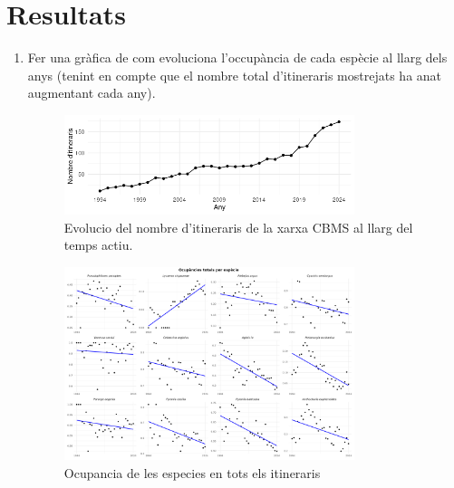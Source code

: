 \documentclass{article}
\begin{document}
\section{Resultats}
\begin{enumerate}
    \item Fer una gr\`afica de com evoluciona l'occup\`ancia de cada esp\`ecie al llarg dels anys (tenint en compte que el nombre total d'itineraris mostrejats ha anat augmentant cada any).





   

 \begin{figure}[h!] %
    \centering %
    \includegraphics[width=0.8\textwidth]{No_of_itineraris_per_any.png} %
    \caption{Evolucio del nombre d'itineraris de la xarxa CBMS al llarg del temps actiu.} %
    \label{fig:mi_imagen} %
\end{figure}

 \begin{figure}[h!] %
    \centering %
    \includegraphics[width=0.8\textwidth]{ocupancies_totals.png} %
    \caption{Ocupancia de les especies en tots els itineraris} %
    \label{fig:mi_imagen} %
\end{figure}




\end{enumerate}
\end{document}
